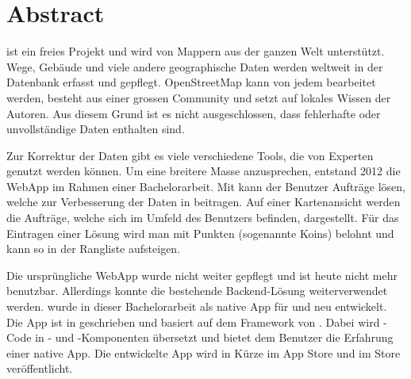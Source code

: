 \chapter*{Abstract}
\thispagestyle{scrheadings}

 ist ein freies Projekt und wird von Mappern aus der ganzen Welt unterstützt.
 Wege, Gebäude und viele andere geographische Daten werden weltweit in der Datenbank erfasst und gepflegt. 
 OpenStreetMap kann von jedem bearbeitet werden, besteht aus einer grossen Community und setzt auf lokales Wissen der Autoren. 
 Aus diesem Grund ist es nicht ausgeschlossen, dass fehlerhafte oder unvollständige Daten enthalten sind.
                    
Zur Korrektur der Daten gibt es viele verschiedene Tools, die von Experten genutzt werden können.
 Um eine breitere Masse anzusprechen, entstand 2012 die \gls{WebApp} \kort{} im Rahmen einer Bachelorarbeit. 
 Mit \kort{} kann der Benutzer Aufträge lösen, welche zur Verbesserung der Daten in  beitragen. 
 Auf einer Kartenansicht werden die Aufträge, welche sich im Umfeld des Benutzers befinden, dargestellt. 
 Für das Eintragen einer Lösung wird man mit Punkten (sogenannte Koins) belohnt und kann so in der Rangliste aufsteigen.
 
Die ursprüngliche \gls{WebApp} wurde nicht weiter gepflegt und ist heute nicht mehr benutzbar. 
Allerdings konnte die bestehende Backend-Lösung weiterverwendet werden. 
\kort{} wurde in dieser Bachelorarbeit als native App für  und  neu entwickelt. 
Die App ist in  geschrieben und basiert auf dem  Framework von . 
Dabei wird -Code in - und -Komponenten übersetzt und bietet dem Benutzer die Erfahrung einer native App.
Die entwickelte App wird in Kürze im  App Store und im  Store veröffentlicht.


 